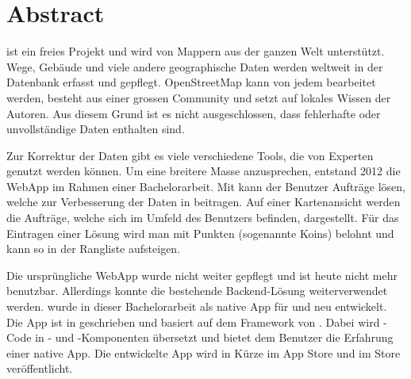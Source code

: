 \chapter*{Abstract}
\thispagestyle{scrheadings}

 ist ein freies Projekt und wird von Mappern aus der ganzen Welt unterstützt.
 Wege, Gebäude und viele andere geographische Daten werden weltweit in der Datenbank erfasst und gepflegt. 
 OpenStreetMap kann von jedem bearbeitet werden, besteht aus einer grossen Community und setzt auf lokales Wissen der Autoren. 
 Aus diesem Grund ist es nicht ausgeschlossen, dass fehlerhafte oder unvollständige Daten enthalten sind.
                    
Zur Korrektur der Daten gibt es viele verschiedene Tools, die von Experten genutzt werden können.
 Um eine breitere Masse anzusprechen, entstand 2012 die \gls{WebApp} \kort{} im Rahmen einer Bachelorarbeit. 
 Mit \kort{} kann der Benutzer Aufträge lösen, welche zur Verbesserung der Daten in  beitragen. 
 Auf einer Kartenansicht werden die Aufträge, welche sich im Umfeld des Benutzers befinden, dargestellt. 
 Für das Eintragen einer Lösung wird man mit Punkten (sogenannte Koins) belohnt und kann so in der Rangliste aufsteigen.
 
Die ursprüngliche \gls{WebApp} wurde nicht weiter gepflegt und ist heute nicht mehr benutzbar. 
Allerdings konnte die bestehende Backend-Lösung weiterverwendet werden. 
\kort{} wurde in dieser Bachelorarbeit als native App für  und  neu entwickelt. 
Die App ist in  geschrieben und basiert auf dem  Framework von . 
Dabei wird -Code in - und -Komponenten übersetzt und bietet dem Benutzer die Erfahrung einer native App.
Die entwickelte App wird in Kürze im  App Store und im  Store veröffentlicht.


 